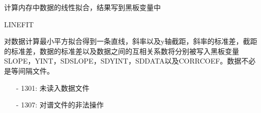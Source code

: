 \label{cmd:linefit}

计算内存中数据的线性拟合，结果写到黑板变量中

\begin{SACSTX}
LINEFIT
\end{SACSTX}

对数据计算最小平方拟合得到一条直线，斜率以及y轴截距，斜率的标准差，截距的标准差，数据的标准差以及数据之间的互相关系数将分别被写入黑板变量SLOPE，YINT，SDSLOPE，SDYINT，SDDATA以及CORRCOEF。数据不必是等间隔文件。

\begin{itemize}
\item[-]1301: 未读入数据文件
\item[-]1307: 对谱文件的非法操作
\end{itemize}
